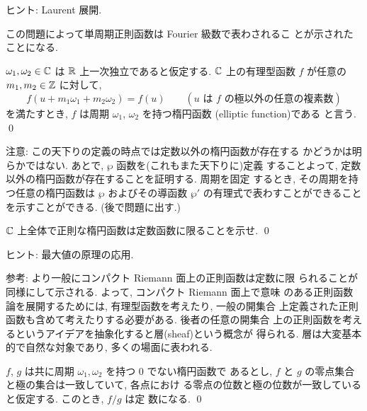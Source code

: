 \documentclass[12pt,twoside]{jarticle}
\def\pe{\wp}
\def\Z{{\Bbb Z}} %
\def\R{{\Bbb R}} %
\def\C{{\Bbb C}} %
\begin{document}
\noindent ヒント: Laurent 展開.

\medskip

\noindent この問題によって単周期正則函数は Fourier 級数で表わされるこ
とが示されたことになる. 

\begin{Definition}[楕円函数の定義]
  $\omega_1, \omega_2\in\C$ は $\R$ 上一次独立であると仮定する. $\C$ 
  上の有理型函数 $f$ が任意の $m_1,m_2\in\Z$ に対して,
  \[
    f(u + m_1\omega_1 + m_2\omega_2) = f(u)
    \qquad
    (\text{$u$ は $f$ の極以外の任意の複素数})
  \] %
  を満たすとき, $f$ は周期 $\omega_1$, $\omega_2$ を持つ楕円函数
  (elliptic function)である
  と言う. \qed
\end{Definition}

\noindent 注意: この天下りの定義の時点では定数以外の楕円函数が存在する
かどうかは明らかではない. あとで, $\pe$ 函数を(これもまた天下りに)定義
することよって, 定数以外の楕円函数が存在することを証明する. 周期を固定
するとき, その周期を持つ任意の楕円函数は $\pe$ およびその導函数 $\pe'$ 
の有理式で表わすことができることを示すことができる. (後で問題に出す.)

\begin{question}\label{q:ef1}\qstar{*}
  $\C$ 上全体で正則な楕円函数は定数函数に限ることを示せ. \qed
\end{question}

\noindent ヒント: 最大値の原理の応用.

\medskip

\noindent 参考: より一般にコンパクト Riemann 面上の正則函数は定数に限
られることが同様にして示される. よって, コンパクト Riemann 面上で意味
のある正則函数論を展開するためには, 有理型函数を考えたり, 一般の開集合
上定義された正則函数も含めて考えたりする必要がある. 後者の任意の開集合
上の正則函数を考えるというアイデアを抽象化すると層(sheaf)という概念が
得られる. 層は大変基本的で自然な対象であり, 多くの場面に表われる.

\begin{question}\label{q:ef1+}\qstar{*}
  $f$, $g$ は共に周期 $\omega_1,\omega_2$ を持つ $0$ でない楕円函数で
  あるとし, $f$ と $g$ の零点集合と極の集合は一致していて, 各点におけ
  る零点の位数と極の位数が一致していると仮定する. このとき, $f/g$ は定
  数になる. \qed
\end{question}
\end{document}
